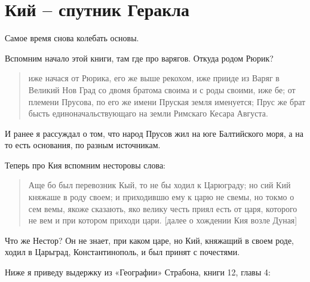 \chapter{Кий – спутник Геракла}

Самое время снова колебать основы.

Вспомним начало этой книги, там где про варягов. Откуда родом Рюрик?

\begin{quotation}
иже начася от Рюрика, его же выше рекохом, иже прииде из Варяг в Великий Нов Град со двомя братома своима и с роды своими, иже бе; от племени Прусова, по его же имени Пруская земля именуется; Прус же брат бысть единоначальствующаго на земли Римскаго Кесара Августа.
\end{quotation}

И ранее я рассуждал о том, что народ Прусов жил на юге Балтийского моря, а на то есть основания, по разным источникам. 

Теперь про Кия вспомним несторовы слова:

\begin{quotation}
Аще бо был перевозник Кый, то не бы ходил к Царюграду; но сий Кий княжаше в роду своем; и приходившю ему к царю не свемы, но токмо о сем вемы, якоже сказають, яко велику честь приял есть от царя, которого не вем и при котором приходи цари. [далее о хождении Кия возле Дуная]
\end{quotation}

Что же Нестор? Он не знает, при каком царе, но Кий, княжащий в своем роде, ходил в Царьград, Константинополь, и был принят с почестями.

Ниже я приведу выдержку из «Географии»\cite{strabon01} Страбона, книги 12, главы 4:


